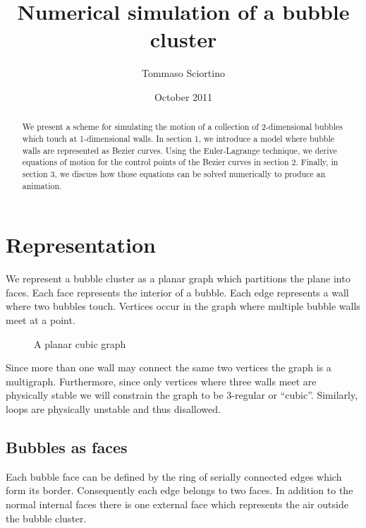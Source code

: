 \documentclass{article}
\title{Numerical simulation of a bubble cluster}
\author{Tommaso Sciortino}
\date{October 2011}
\begin{document}
\maketitle
\begin{abstract}
We present a scheme for simulating the motion of a collection of 2-dimensional
bubbles which touch at 1-dimensional walls.  In section 1, we introduce a model
where bubble walls are represented as Bezier curves.  Using the
Euler-Lagrange technique, we derive equations of motion for the
control points of the Bezier curves in section 2. Finally, in section 3, we
discuss how those equations can be solved numerically to produce an animation.
\end{abstract}
\clearpage

\section{Representation}
We represent a bubble cluster as a planar graph which partitions the plane
into faces. Each face represents the interior of a bubble. Each edge represents
a wall where two bubbles touch. Vertices occur in the graph where
multiple bubble walls meet at a point.

\begin{figure}[h]
\centering
{}
\caption{A planar cubic graph}
\end{figure}

Since more than one wall may connect the same two vertices the graph is a
multigraph. Furthermore, since only vertices where three walls meet 
are physically stable we will constrain the graph to be 3-regular or ``cubic''.
Similarly, loops are physically unstable and thus disallowed.

\subsection{Bubbles as faces}
Each bubble face can be defined by the ring of serially connected edges which
form its border. Consequently each edge belongs to two faces. In addition to
the normal internal faces there is one external face which represents the air
outside the bubble cluster.
\end{document}
